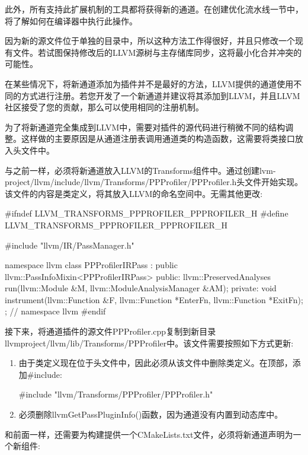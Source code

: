 此外，所有支持此扩展机制的工具都将获得新的通道。在创建优化流水线一节中，将了解如何在编译器中执行此操作。

因为新的源文件位于单独的目录中，所以这种方法工作得很好，并且只修改一个现有文件。若试图保持修改后的LLVM源树与主存储库同步，这将最小化合并冲突的可能性。

在某些情况下，将新通道添加为插件并不是最好的方法，LLVM提供的通道使用不同的方式进行注册。若您开发了一个新通道并建议将其添加到LLVM，并且LLVM社区接受了您的贡献，那么可以使用相同的注册机制。


为了将新通道完全集成到LLVM中，需要对插件的源代码进行稍微不同的结构调整。这样做的主要原因是从通道注册表调用通道类的构造函数，这需要将类接口放入头文件中。

与之前一样，必须将新通道放入LLVM的Transforms组件中。通过创建lvm-project/llvm/include/llvm/Transforms/PPProfiler/PPProfiler.h头文件开始实现。该文件的内容是类定义，将其放入LLVM的命名空间中。无需其他更改:

\begin{cpp}
#ifndef LLVM_TRANSFORMS_PPPROFILER_PPPROFILER_H
#define LLVM_TRANSFORMS_PPPROFILER_PPPROFILER_H

#include "llvm/IR/PassManager.h"

namespace llvm {
class PPProfilerIRPass
    : public llvm::PassInfoMixin<PPProfilerIRPass> {
public:
    llvm::PreservedAnalyses
    run(llvm::Module &M, llvm::ModuleAnalysisManager &AM);
private:
    void instrument(llvm::Function &F,
                    llvm::Function *EnterFn,
                    llvm::Function *ExitFn);
};
} // namespace llvm
#endif
\end{cpp}

接下来，将通道插件的源文件PPProfiler.cpp复制到新目录llvmproject/llvm/lib/Transforms/PPProfiler中。该文件需要按照如下方式更新:

\begin{enumerate}
\item
由于类定义现在位于头文件中，因此必须从该文件中删除类定义。在顶部，添加\#include:

\begin{cpp}
#include "llvm/Transforms/PPProfiler/PPProfiler.h"
\end{cpp}

\item
必须删除llvmGetPassPluginInfo()函数，因为通道没有内置到动态库中。
\end{enumerate}

和前面一样，还需要为构建提供一个CMakeLists.txt文件，必须将新通道声明为一个新组件:

